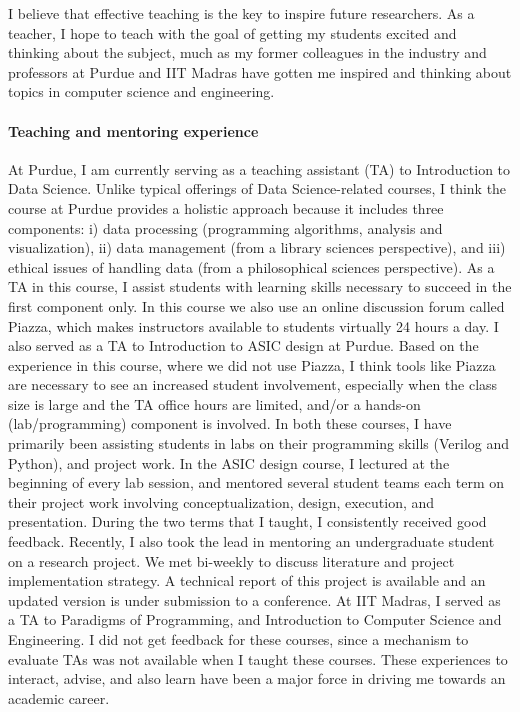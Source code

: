 I believe that effective teaching is the key to inspire future researchers. 
As a teacher, I hope to teach with the goal of getting my students excited and thinking about the subject, much as my former colleagues in the industry and professors at Purdue and IIT Madras have gotten me inspired and thinking about topics in computer science and engineering. 

\paragraph{Teaching and mentoring experience}
At Purdue, I am currently serving as a teaching assistant (TA) to Introduction to Data Science. 
Unlike typical offerings of Data Science-related courses, I think the course at Purdue provides a holistic approach because
it includes three components: i) data processing (programming algorithms, analysis and visualization), ii) data management (from a library sciences perspective), and iii) ethical issues of handling data (from a philosophical sciences perspective).
As a TA in this course, I assist students with learning skills necessary to succeed in the first component only.
In this course we also use an online discussion forum called Piazza, which makes instructors available to students virtually 24 hours a day.
I also served as a TA to Introduction to ASIC design at Purdue. 
Based on the experience in this course, where we did not use Piazza, I think tools like Piazza are necessary to see an increased student involvement, especially when the class size is large and the TA office hours are limited, and/or a hands-on (lab/programming) component is involved. 
In both these courses, I have primarily been assisting students in labs on their programming skills (Verilog and Python), and project work.
In the ASIC design course, I lectured at the beginning of every lab session, and mentored several student teams each term on their project work involving conceptualization, design, execution, and presentation.
During the two terms that I taught, I consistently received good feedback.  
Recently, I also took the lead in mentoring an undergraduate student on a research project. 
We met bi-weekly to discuss literature and project implementation strategy.   
A technical report of this project is available and an updated version is under submission to a conference. 
At IIT Madras, I served as a TA to Paradigms of Programming, and Introduction to Computer Science and Engineering.
I did not get feedback for these courses, since a mechanism to evaluate TAs was not available when I taught these courses.
These experiences to interact, advise, and also learn have been a major force in driving me towards an academic career.

